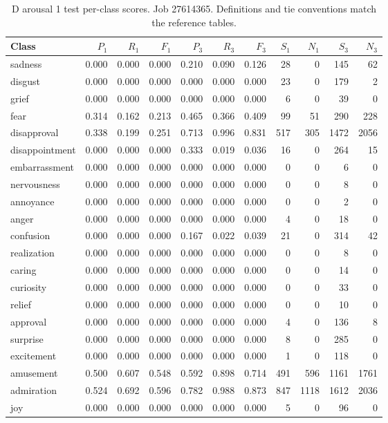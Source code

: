 \begin{table}[!htbp]
\centering
\scriptsize
\setlength{\tabcolsep}{5pt}
\begin{tabular}{lrrrrrrrrrr}
\toprule
Class & $P_1$ & $R_1$ & $F_1$ & $P_3$ & $R_3$ & $F_3$ & $S_1$ & $N_1$ & $S_3$ & $N_3$ \\
\midrule
sadness & 0.000 & 0.000 & 0.000 & 0.210 & 0.090 & 0.126 & 28 & 0 & 145 & 62 \\
disgust & 0.000 & 0.000 & 0.000 & 0.000 & 0.000 & 0.000 & 23 & 0 & 179 & 2 \\
grief & 0.000 & 0.000 & 0.000 & 0.000 & 0.000 & 0.000 & 6 & 0 & 39 & 0 \\
fear & 0.314 & 0.162 & 0.213 & 0.465 & 0.366 & 0.409 & 99 & 51 & 290 & 228 \\
disapproval & 0.338 & 0.199 & 0.251 & 0.713 & 0.996 & 0.831 & 517 & 305 & 1472 & 2056 \\
disappointment & 0.000 & 0.000 & 0.000 & 0.333 & 0.019 & 0.036 & 16 & 0 & 264 & 15 \\
embarrassment & 0.000 & 0.000 & 0.000 & 0.000 & 0.000 & 0.000 & 0 & 0 & 6 & 0 \\
nervousness & 0.000 & 0.000 & 0.000 & 0.000 & 0.000 & 0.000 & 0 & 0 & 8 & 0 \\
annoyance & 0.000 & 0.000 & 0.000 & 0.000 & 0.000 & 0.000 & 0 & 0 & 2 & 0 \\
anger & 0.000 & 0.000 & 0.000 & 0.000 & 0.000 & 0.000 & 4 & 0 & 18 & 0 \\
confusion & 0.000 & 0.000 & 0.000 & 0.167 & 0.022 & 0.039 & 21 & 0 & 314 & 42 \\
realization & 0.000 & 0.000 & 0.000 & 0.000 & 0.000 & 0.000 & 0 & 0 & 8 & 0 \\
caring & 0.000 & 0.000 & 0.000 & 0.000 & 0.000 & 0.000 & 0 & 0 & 14 & 0 \\
curiosity & 0.000 & 0.000 & 0.000 & 0.000 & 0.000 & 0.000 & 0 & 0 & 33 & 0 \\
relief & 0.000 & 0.000 & 0.000 & 0.000 & 0.000 & 0.000 & 0 & 0 & 10 & 0 \\
approval & 0.000 & 0.000 & 0.000 & 0.000 & 0.000 & 0.000 & 4 & 0 & 136 & 8 \\
surprise & 0.000 & 0.000 & 0.000 & 0.000 & 0.000 & 0.000 & 8 & 0 & 285 & 0 \\
excitement & 0.000 & 0.000 & 0.000 & 0.000 & 0.000 & 0.000 & 1 & 0 & 118 & 0 \\
amusement & 0.500 & 0.607 & 0.548 & 0.592 & 0.898 & 0.714 & 491 & 596 & 1161 & 1761 \\
admiration & 0.524 & 0.692 & 0.596 & 0.782 & 0.988 & 0.873 & 847 & 1118 & 1612 & 2036 \\
joy & 0.000 & 0.000 & 0.000 & 0.000 & 0.000 & 0.000 & 5 & 0 & 96 & 0 \\
\bottomrule
\end{tabular}
\caption{D arousal 1 test per-class scores. Job 27614365. Definitions and tie conventions match the reference tables.}
\label{tab:classes-d_arousal_k1}
\end{table}
